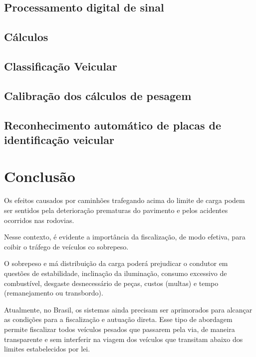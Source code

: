 \documentclass{ufscThesis}
\begin{document}
\section{Processamento digital de sinal}\label{algoritmos-dsp}



\section{Cálculos}\label{algoritmos-calculos}


\section{Classificação Veicular}\label{algoritmos-classificacao}


\section{Calibração dos cálculos de pesagem}\label{algoritmos-calibracao}


\section{Reconhecimento automático de placas de identificação veicular}\label{algoritmos-alpr}


\chapter{Conclusão}\label{conclusao}

Os efeitos causados por caminhões trafegando acima do limite de carga podem ser sentidos pela deterioração prematuras do pavimento e pelos acidentes ocorridos nas rodovias.

Nesse contexto, é evidente a importância da fiscalização, de modo efetiva, para coibir o tráfego de veículos co sobrepeso.

O sobrepeso e má distribuição da carga poderá prejudicar o condutor em questões de estabilidade, inclinação da iluminação, consumo excessivo de combustível, desgaste desnecessário de peças, custos (multas) e tempo (remanejamento ou transbordo).

Atualmente, no Brasil, os sistemas ainda precisam ser aprimorados para alcançar as condições para a fiscalização e autuação direta. Esse tipo de abordagem permite fiscalizar todos veículos pesados que passarem pela via, de maneira transparente e sem interferir na viagem dos veículos que transitam abaixo dos limites estabelecidos por lei.
\end{document}
